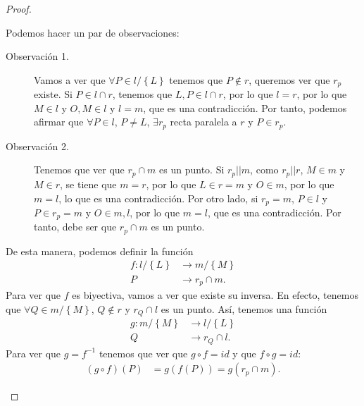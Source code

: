\begin{proof}
\begin{description}
	Podemos hacer un par de observaciones:
	\begin{description}
		\item[Observación 1.] Vamos a ver que $\displaystyle \forall P \in l/ \left\{ L\right\}  $ tenemos que $\displaystyle P \not\in r$, queremos ver que $\displaystyle r _{p} $ existe. Si $\displaystyle P \in l \cap r $, tenemos que $\displaystyle L, P \in l \cap r $, por lo que $\displaystyle l = r $, por lo que $\displaystyle M \in l $ y $\displaystyle O,M \in l  $ y $\displaystyle l = m $, que es una contradicción. Por tanto, podemos afirmar que $\displaystyle \forall P \in l $, $\displaystyle P \neq L $, $\displaystyle \exists r_{p} $ recta paralela a $\displaystyle r $ y $\displaystyle P \in r_{p} $.
		\item[Observación 2.] Tenemos que ver que $\displaystyle r_{p} \cap m $ es un punto. Si $\displaystyle r_{p} | | m $, como $\displaystyle r_{p} | | r $, $\displaystyle M \in m $ y $\displaystyle M \in r $, se tiene que $\displaystyle m = r $, por lo que $\displaystyle L \in r = m $ y $\displaystyle O \in m $, por lo que $\displaystyle m = l $, lo que es una contradicción. Por otro lado, si $\displaystyle r_{p} = m $, $\displaystyle P \in l $ y $\displaystyle P \in r_{p} = m $ y $\displaystyle O \in m,l $, por lo que $\displaystyle m = l $, que es una contradicción. Por tanto, debe ser que $\displaystyle r_{p}\cap m $ es un punto.
	\end{description}
	De esta manera, podemos definir la función
	\[
	\begin{split}
		f : l / \left\{ L\right\} & \to m / \left\{ M\right\} \\
		P & \to r_{p} \cap m.
	\end{split}
	\]
	Para ver que $\displaystyle f $ es biyectiva, vamos a ver que existe su inversa. En efecto, tenemos que $\displaystyle \forall Q \in m / \left\{ M\right\}  $, $\displaystyle Q \not\in r $ y $\displaystyle r_{Q}\cap l $ es un punto. Así, tenemos una función
	\[
	\begin{split}
		g : m/ \left\{ M\right\} & \to l / \left\{ L\right\} \\
		Q & \to r_{Q} \cap l.
	\end{split}
	\]
Para ver que $\displaystyle g = f^{-1} $ tenemos que ver que $\displaystyle g\circ f = id $ y que $\displaystyle f\circ g = id $:
\[
\begin{split}
	\left(g \circ f\right)\left(P\right) & = g\left(f\left(P\right)\right) = g\left(r_{p} \cap m\right) .
\end{split}
\]
\end{description}
\end{proof}
